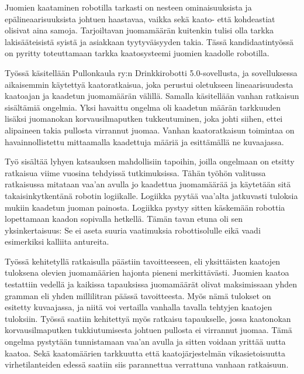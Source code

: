 Juomien kaataminen robotilla tarkasti on nesteen ominaisuuksista ja epälineaarisuuksista johtuen haastavaa, vaikka sekä kaato- että kohdeastiat olisivat aina samoja. Tarjoiltavan juomamäärän kuitenkin tulisi olla tarkka lakisääteisistä syistä ja asiakkaan tyytyväisyyden takia. Tässä kandidaatintyössä on pyritty toteuttamaan tarkka kaatosysteemi juomien kaadolle robotilla.

Työssä käsitellään Pullonkaula ry:n Drinkkirobotti 5.0\hyp{}sovellusta, ja sovelluksessa aikaisemmin käytettyä kaatoratkaisua, joka perustui oletukseen lineaarisuudesta kaatoajan ja kaadetun juomamäärän välillä. Samalla käsitellään vanhan ratkaisun sisältämiä ongelmia. Yksi havaittu ongelma oli kaadetun määrän tarkkuuden lisäksi juomanokan korvausilmaputken tukkeutuminen, joka johti siihen, ettei alipaineen takia pullosta virrannut juomaa. Vanhan kaatoratkaisun toimintaa on havainnollistettu mittaamalla kaadettuja määriä ja esittämällä ne kuvaajassa.

Työ sisältää lyhyen katsauksen mahdollisiin tapoihin, joilla ongelmaan on etsitty ratkaisua viime vuosina tehdyissä tutkimuksissa. Tähän työhön valitussa ratkaisussa mitataan vaa'an avulla jo kaadettua juomamäärää ja käytetään sitä takaisinkytkentänä robotin logiikalle. Logiikka pyytää vaa'alta jatkuvasti tuloksia mukiin kaadetun juoman painosta. Logiikka pystyy sitten käskemään robottia lopettamaan kaadon sopivalla hetkellä. Tämän tavan etuna oli sen yksinkertaisuus: Se ei aseta suuria vaatimuksia robottisolulle eikä vaadi esimerkiksi kalliita antureita.

Työssä kehitetyllä ratkaisulla päästiin tavoitteeseen, eli yksittäisten kaatojen tuloksena olevien juomamäärien hajonta pieneni merkittävästi. Juomien kaatoa testattiin vedellä ja kaikissa tapauksissa juomamäärät olivat maksimissaan yhden gramman eli yhden millilitran päässä tavoitteesta. Myös nämä tulokset on esitetty kuvaajassa, ja niitä voi vertailla vanhalla tavalla tehtyjen kaatojen tuloksiin. Työssä saatiin kehitettyä myös ratkaisu tapaukselle, jossa kaatonokan korvausilmaputken tukkiutumisesta johtuen pullosta ei virrannut juomaa. Tämä ongelma pystytään tunnistamaan vaa'an avulla ja sitten voidaan yrittää uutta kaatoa. Sekä kaatomäärien tarkkuutta että kaatojärjestelmän vikasietoisuutta virhetilanteiden edessä saatiin siis parannettua verrattuna vanhaan ratkaisuun.
